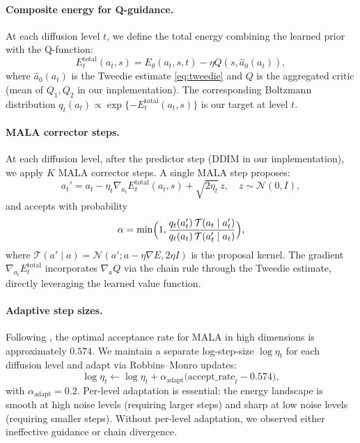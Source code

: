\documentclass{article}
\theoremstyle{plain}
\theoremstyle{definition}
\theoremstyle{remark}
\begin{document}
\paragraph{Composite energy for Q-guidance.}
At each diffusion level $t$, we define the total energy combining the learned prior with the Q-function:
\begin{equation}
  E_t^{\text{total}}(a_t, s) = E_\theta(a_t, s, t) - \eta Q(s, \hat{a}_0(a_t)),
  \label{eq:total-energy}
\end{equation}
where $\hat{a}_0(a_t)$ is the Tweedie estimate \cref{eq:tweedie} and $Q$ is the aggregated critic (mean of $Q_1, Q_2$ in our implementation).
The corresponding Boltzmann distribution $q_t(a_t) \propto \exp\{-E_t^{\text{total}}(a_t, s)\}$ is our target at level $t$.

\paragraph{MALA corrector steps.}
At each diffusion level, after the predictor step (DDIM in our implementation), we apply $K$ MALA corrector steps.
A single MALA step proposes:
\begin{equation}
  a_t' = a_t - \eta_t \nabla_{a_t} E_t^{\text{total}}(a_t, s) + \sqrt{2\eta_t}\, z, \quad z \sim \mathcal{N}(0, I),
  \label{eq:mala-proposal}
\end{equation}
and accepts with probability
\begin{equation}
  \alpha = \min\Bigl(1, \frac{q_t(a_t') \, \mathcal{T}(a_t \mid a_t')}{q_t(a_t) \, \mathcal{T}(a_t' \mid a_t)}\Bigr),
  \label{eq:mh-accept}
\end{equation}
where $\mathcal{T}(a' \mid a) = \mathcal{N}(a' ; a - \eta \nabla E, 2\eta I)$ is the proposal kernel.
The gradient $\nabla_{a_t} E_t^{\text{total}}$ incorporates $\nabla_a Q$ via the chain rule through the Tweedie estimate, directly leveraging the learned value function.

\paragraph{Adaptive step sizes.}
Following \citet{RobertsTweedie1996MALA}, the optimal acceptance rate for MALA in high dimensions is approximately $0.574$.
We maintain a separate log-step-size $\log \eta_t$ for each diffusion level and adapt via Robbins--Monro updates:
\begin{equation}
  \log \eta_t \leftarrow \log \eta_t + \alpha_{\text{adapt}} \bigl(\text{accept\_rate}_t - 0.574\bigr),
  \label{eq:eta-adapt}
\end{equation}
with $\alpha_{\text{adapt}} = 0.2$.
Per-level adaptation is essential: the energy landscape is smooth at high noise levels (requiring larger steps) and sharp at low noise levels (requiring smaller steps).
Without per-level adaptation, we observed either ineffective guidance or chain divergence.
\end{document}
